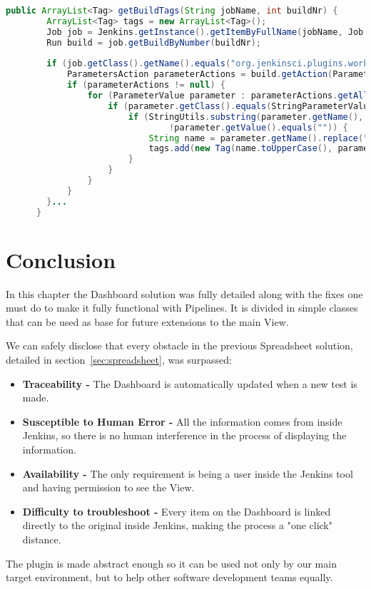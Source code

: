 \begin{lstlisting}[language=Java, label=java:pipelineIf, caption=Java Condition Statement Workaround]
    public ArrayList<Tag> getBuildTags(String jobName, int buildNr) {
        ArrayList<Tag> tags = new ArrayList<Tag>();
        Job job = Jenkins.getInstance().getItemByFullName(jobName, Job.class);
        Run build = job.getBuildByNumber(buildNr);
        
        if (job.getClass().getName().equals("org.jenkinsci.plugins.workflow.job.WorkflowJob")) {
            ParametersAction parameterActions = build.getAction(ParametersAction.class);
            if (parameterActions != null) {
                for (ParameterValue parameter : parameterActions.getAllParameters()) {
                    if (parameter.getClass().equals(StringParameterValue.class)) {
                        if (StringUtils.substring(parameter.getName(), 0, "metadata:".length()).equals("metadata:") &&
                                !parameter.getValue().equals("")) {
                            String name = parameter.getName().replace("metadata:", "");
                            tags.add(new Tag(name.toUpperCase(), parameter.getValue().toString().toLowerCase()));
                        }
                    }
                }
            }
        }...        
      }      
\end{lstlisting}

\section{Conclusion}\label{sc:conclusion}

In this chapter the Dashboard solution was fully detailed along with the fixes one must do to make it fully functional with Pipelines. It is divided in simple classes that can be used as base for future extensions to the main View.

We can safely disclose that every obstacle in the previous Spreadsheet solution, detailed in section~\ref{sec:spreadsheet}, was surpassed:

\begin{itemize}
\item \textbf{Traceability - } The Dashboard is automatically updated when a new test is made.
\item \textbf{Susceptible to Human Error - } All the information comes from inside Jenkins, so there is no human interference in the process of displaying the information.
\item \textbf{Availability - } The only requirement is being a user inside the Jenkins tool and having permission to see the View.
\item \textbf{Difficulty to troubleshoot - } Every item on the Dashboard is linked directly to the original inside Jenkins, making the process a "one click" distance.
\end{itemize}

The plugin is made abstract enough so it can be used not only by our main target environment, but to help other software development teams equally.